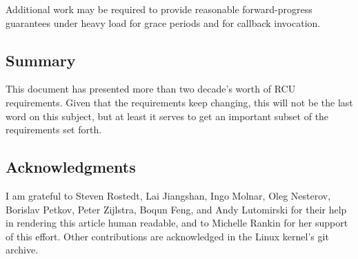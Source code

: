 Additional work may be required to provide reasonable forward-progress
guarantees under heavy load for grace periods and for callback
invocation.


\subsection{Summary}

This document has presented more than two decade's worth of RCU
requirements.
Given that the requirements keep changing, this will not
be the last word on this subject, but at least it serves to get an
important subset of the requirements set forth.


\subsection{Acknowledgments}

I am grateful to Steven Rostedt, Lai Jiangshan, Ingo Molnar, Oleg
Nesterov, Borislav Petkov, Peter Zijlstra, Boqun Feng, and Andy
Lutomirski for their help in rendering this article human readable, and
to Michelle Rankin for her support of this effort.
Other contributions
are acknowledged in the Linux kernel's git archive.
